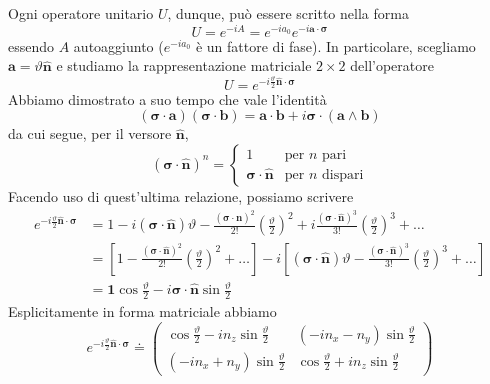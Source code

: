 Ogni operatore unitario $U$, dunque, può essere scritto nella forma
\begin{equation}
U=e^{-iA}=e^{-ia_0}e^{-i\textbf{a}\cdot\boldsymbol\sigma}
\end{equation}
essendo $A$ autoaggiunto ($e^{-ia_0}$ è un fattore di fase). In particolare, scegliamo $\textbf{a}=\vartheta\hat{\textbf{n}}$ e studiamo la rappresentazione matriciale $2\times2$ dell'operatore
\begin{equation} \label{eqn:unit rot}
U=e^{-i\frac{\vartheta}{2}\hat{\textbf{n}}\cdot\boldsymbol\sigma}
\end{equation}
Abbiamo dimostrato a suo tempo che vale l'identità
\begin{equation}
\left(\boldsymbol\sigma\cdot\textbf{a}\right)\left(\boldsymbol\sigma\cdot\textbf{b}\right)=\textbf{a}\cdot\textbf{b}+i\boldsymbol\sigma\cdot\left(\textbf{a}\wedge\textbf{b}\right)
\end{equation}
da cui segue, per il versore $\hat{\textbf{n}}$,
\begin{equation}
(\boldsymbol\sigma\cdot\hat{\textbf{n}})^n=\begin{cases}
1 & \text{per $n$ pari} \\
\boldsymbol\sigma\cdot\hat{\textbf{n}} & \text{per $n$ dispari}
\end{cases}
\end{equation}
Facendo uso di quest'ultima relazione, possiamo scrivere 
\begin{equation}  \label{eqn:unit matrix} \begin{split}
e^{-i\frac{\vartheta}{2}\hat{\textbf{n}}\cdot\boldsymbol\sigma}
&= 1-i(\boldsymbol\sigma\cdot\hat{\textbf{n}})\vartheta-\frac{(\boldsymbol\sigma\cdot\hat{\textbf{n}})^2}{2!}{\left(\frac{\vartheta}{2}\right)}^2+i\frac{(\boldsymbol\sigma\cdot\hat{\textbf{n}})^3}{3!}{\left(\frac{\vartheta}{2}\right)}^3+\dots \\
&= \left[{1-\frac{(\boldsymbol\sigma\cdot\hat{\textbf{n}})^2}{2!}{\left(\frac{\vartheta}{2}\right)}^2+\dots}\right]-i\left[{(\boldsymbol\sigma\cdot\hat{\textbf{n}})\vartheta-\frac{(\boldsymbol\sigma\cdot\hat{\textbf{n}})^3}{3!}{\left(\frac{\vartheta}{2}\right)}^3}+\dots\right] \\
&= \textbf{1}\cos{\frac{\vartheta}{2}}-i\boldsymbol\sigma\cdot\hat{\textbf{n}}\sin{\frac{\vartheta}{2}}
\end{split} \end{equation}
Esplicitamente in forma matriciale abbiamo
\begin{equation}
e^{-i\frac{\vartheta}{2}\hat{\textbf{n}}\cdot\boldsymbol\sigma} \doteq
\begin{pmatrix}
\cos{\frac{\vartheta}{2}}-in_z\sin{\frac{\vartheta}{2}} & (-in_x-n_y)\sin{\frac{\vartheta}{2}} \\
(-in_x+n_y)\sin{\frac{\vartheta}{2}} & \cos{\frac{\vartheta}{2}}+in_z\sin{\frac{\vartheta}{2}}
\end{pmatrix}
\end{equation}
